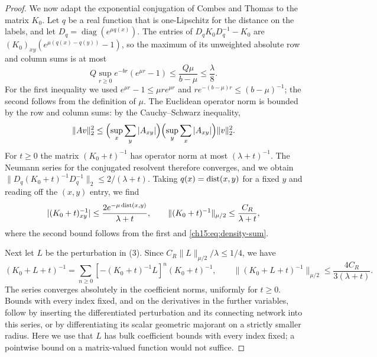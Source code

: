 \begin{proof}
We now adapt the exponential conjugation of Combes and Thomas \cite{CombesThomas1973} to the matrix $K_0$. Let $q$ be a real function that is one-Lipschitz for the distance on the labels, and let $D_q=\operatorname{diag}(e^{\mu q(x)})$. The entries of $D_qK_0D_q^{-1}-K_0$ are $(K_0)_{xy}(e^{\mu(q(x)-q(y))}-1)$, so the maximum of its unweighted absolute row and column sums is at most
\[
 Q\sup_{r\ge0}e^{-br}(e^{\mu r}-1)
 \le\frac{Q\mu}{b-\mu}\le\frac\lambda8 .
\]
For the first inequality we used $e^{\mu r}-1\le\mu re^{\mu r}$ and $re^{-(b-\mu)r}\le(b-\mu)^{-1}$; the second follows from the definition of $\mu$. The Euclidean operator norm is bounded by the row and column sums: by the Cauchy--Schwarz inequality,
\[
 \|Av\|_2^2\le\Bigl(\sup_x\sum_y|A_{xy}|\Bigr)\Bigl(\sup_y\sum_x|A_{xy}|\Bigr)\|v\|_2^2 .
\]
For $t\ge0$ the matrix $(K_0+t)^{-1}$ has operator norm at most $(\lambda+t)^{-1}$. The Neumann series for the conjugated resolvent therefore converges, and we obtain $\|D_q(K_0+t)^{-1}D_q^{-1}\|_2\le2/(\lambda+t)$. Taking $q(x)=\operatorname{dist}(x,y)$ for a fixed $y$ and reading off the $(x,y)$ entry, we find
\[
 |(K_0+t)^{-1}_{xy}|\le
       \frac{2e^{-\mu\operatorname{dist}(x,y)}}{\lambda+t},\qquad
 \|(K_0+t)^{-1}\|_{\mu/2}\le\frac{C_R}{\lambda+t},
\]
where the second bound follows from the first and \eqref{ch15:eq:density-sum}.

Next let $L$ be the perturbation in (3). Since $C_R\|L\|_{\mu/2}/\lambda\le1/4$, we have
\begin{equation}\label{ch15:eq:coefficient-resolvent}
 (K_0+L+t)^{-1}
  =\sum_{n\ge0}[-(K_0+t)^{-1}L]^n(K_0+t)^{-1},\qquad
 \|(K_0+L+t)^{-1}\|_{\mu/2}
       \le\frac{4C_R}{3(\lambda+t)} .
\end{equation}
The series converges absolutely in the coefficient norms, uniformly for $t\ge0$. Bounds with every index fixed, and on the derivatives in the further variables, follow by inserting the differentiated perturbation and its connecting network into this series, or by differentiating its scalar geometric majorant on a strictly smaller radius. Here we use that $L$ has bulk coefficient bounds with every index fixed; a pointwise bound on a matrix-valued function would not suffice.


\end{proof}
